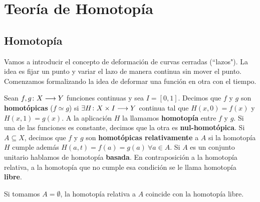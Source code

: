 \documentclass[GTS.tex]{subfiles}
\begin{document}
%
\renewcommand\chaptername{\Huge Tema}
%
\titleformat{\chapter}[display]
    {\normalfont\huge\bfseries}{\chaptertitlename\ \thechapter}{10pt}{\Huge}
\titlespacing*{\chapter}{0pt}{-1cm}{10pt}
%
\chapter{Teoría de Homotopía}

\section{Homotopía}
Vamos a introducir el concepto de deformación de curvas cerradas (``lazos"). La idea es fijar un punto y variar el lazo de manera continua sin mover el punto. Comenzamos formalizando la idea de deformar una función en otra con el tiempo. 

\begin{defi} Sean $f,g\colon{X}\longrightarrow{Y}$ funciones continuas y sea $I=[0,1]$. Decimos que $f$ y $g$ son \textbf{homotópicas} ($f\simeq g$) si $\exists H\colon{X\times I}\longrightarrow{Y}$ continua tal que $H(x,0)=f(x)$ y $H(x,1)=g(x)$. A la aplicación $H$ la llamamos \textbf{homotopía} entre $f$ y $g$. Si una de las funciones es constante, decimos que la otra es \textbf{nul-homotópica}. Si $A\subseteq X$, decimos que $f$ y $g$ son \textbf{homotópicas relativamente} a $A$ si la homotopía $H$ cumple además $H(a,t)=f(a)=g(a)\ \forall a\in A$. Si $A$ es un conjunto unitario hablamos de homotopía \textbf{basada}. En contraposición a la homotopía relativa, a la homotopía que no cumple esa condición se le llama homotopía \textbf{libre}.
\end{defi}

\begin{nota} Si tomamos $A=\emptyset$, la homotopía relativa a $A$ coincide con la homotopía libre.
\end{nota}
\end{document}
